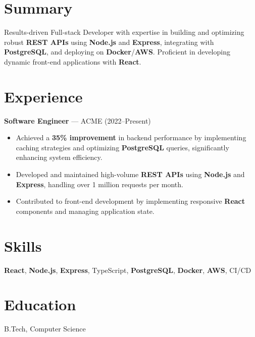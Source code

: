 \documentclass{article}
\begin{document}
\section*{Summary}
Results-driven Full-stack Developer with expertise in building and optimizing robust \textbf{REST APIs} using \textbf{Node.js} and \textbf{Express}, integrating with \textbf{PostgreSQL}, and deploying on \textbf{Docker}/\textbf{AWS}. Proficient in developing dynamic front-end applications with \textbf{React}.

\section*{Experience}
\textbf{Software Engineer} — ACME (2022--Present)\\
\begin{itemize}
    \item Achieved a \textbf{35\% improvement} in backend performance by implementing caching strategies and optimizing \textbf{PostgreSQL} queries, significantly enhancing system efficiency.
    \item Developed and maintained high-volume \textbf{REST APIs} using \textbf{Node.js} and \textbf{Express}, handling over 1 million requests per month.
    \item Contributed to front-end development by implementing responsive \textbf{React} components and managing application state.
\end{itemize}

\section*{Skills}
\textbf{React}, \textbf{Node.js}, \textbf{Express}, TypeScript, \textbf{PostgreSQL}, \textbf{Docker}, \textbf{AWS}, CI/CD

\section*{Education}
B.Tech, Computer Science
\end{document}
